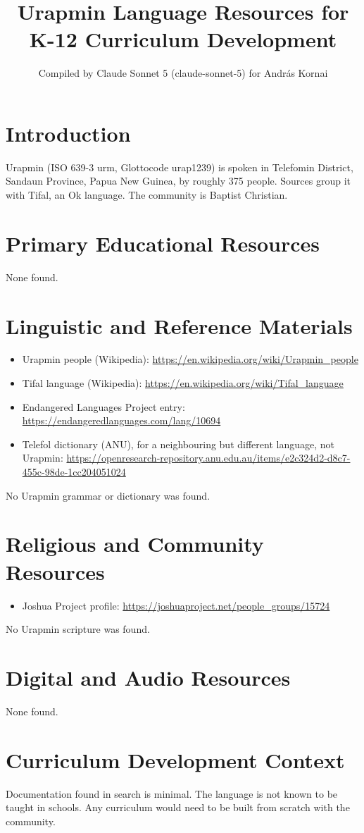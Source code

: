 \documentclass[12pt]{article}
\title{Urapmin Language Resources for K-12 Curriculum Development}
\author{Compiled by Claude Sonnet 5 (claude-sonnet-5) for Andr\'as Kornai}
\date{}
\begin{document}
\maketitle
\section{Introduction}
Urapmin (ISO 639-3 urm, Glottocode urap1239) is spoken in Telefomin District, Sandaun Province, Papua New Guinea, by roughly 375 people. Sources group it with Tifal, an Ok language. The community is Baptist Christian.
\section{Primary Educational Resources}
None found.
\section{Linguistic and Reference Materials}
\begin{itemize}
\item Urapmin people (Wikipedia): \url{https://en.wikipedia.org/wiki/Urapmin_people}
\item Tifal language (Wikipedia): \url{https://en.wikipedia.org/wiki/Tifal_language}
\item Endangered Languages Project entry: \url{https://endangeredlanguages.com/lang/10694}
\item Telefol dictionary (ANU), for a neighbouring but different language, not Urapmin: \url{https://openresearch-repository.anu.edu.au/items/e2c324d2-d8c7-455c-98de-1cc204051024}
\end{itemize}
No Urapmin grammar or dictionary was found.
\section{Religious and Community Resources}
\begin{itemize}
\item Joshua Project profile: \url{https://joshuaproject.net/people_groups/15724}
\end{itemize}
No Urapmin scripture was found.
\section{Digital and Audio Resources}
None found.
\section{Curriculum Development Context}
Documentation found in search is minimal. The language is not known to be taught in schools. Any curriculum would need to be built from scratch with the community.
\end{document}
